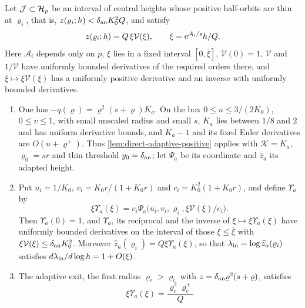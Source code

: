 \begin{lemma}
\label{lem:positive-branch-adaptive-exit}
Let \(\mathcal J\subset\mathcal H_p\) be an interval of central heights whose
positive half-orbits are thin at \(\varrho_i\), that is,
\(z(\varrho_i;h)<\delta_{\rm an}K_0^2Q\), and satisfy
\begin{equation}
\label{eq:positive-adaptive-prefix}
 z(\varrho_i;h)=Q\,\xi\mathcal V(\xi),\qquad \xi=\mathrm e^{\mathcal A_i/s}h/Q .
\end{equation}
Here \(\mathcal A_i\) depends only on \(p\), \(\xi\) lies in a fixed
interval \([0,\bar\xi]\), \(\mathcal V(0)=1\), \(\mathcal V\) and
\(1/\mathcal V\) have uniformly bounded derivatives of the required orders
there, and \(\xi\mapsto\xi\mathcal V(\xi)\) has a uniformly positive
derivative and an inverse with uniformly bounded derivatives.
\begin{enumerate}[label=\textup{(\roman*)}]
\item One has \(-q(\varrho)=\varrho^2(s+\varrho)K_a\). On the box
\(0\le u\le3/(2K_0)\), \(0\le v\le1\), with small unscaled radius and
small \(s\), \(K_a\) lies between \(1/8\) and \(2\) and has uniform
derivative bounds, and \(K_a-1\) and its fixed Euler derivatives are
\(O(u+\varrho^+)\). Thus \cref{lem:direct-adaptive-positive} applies with
\(\mathcal K=K_a\), \(\varrho_0=sr\) and thin threshold \(y_0=\delta_{\rm an}\);
let \(\Psi_a\) be its coordinate and \(\widehat z_a\) its adapted height.
\item Put \(u_i=1/K_0\), \(v_i=K_0r/(1+K_0r)\) and \(c_i=K_0^2(1+K_0r)\),
and define \(\Upsilon_a\) by
\begin{equation}
\label{eq:positive-adaptive-unit}
 \xi\Upsilon_a(\xi)
   =c_i\Psi_a\bigl(u_i,v_i,\varrho_i,\xi\mathcal V(\xi)/c_i\bigr).
\end{equation}
Then \(\Upsilon_a(0)=1\), and \(\Upsilon_a\), its reciprocal and the
inverse of \(\xi\mapsto\xi\Upsilon_a(\xi)\) have uniformly bounded
derivatives on the interval of those \(\xi\le\bar\xi\) with
\(\xi\mathcal V(\xi)\le\delta_{\rm an}K_0^2\). Moreover
\(\widehat z_a(\varrho_i)=Q\xi\Upsilon_a(\xi)\), so that
\(\lambda_{\rm in}=\log\widehat z_a(\varrho_i)\) satisfies
\(d\lambda_{\rm in}/d\log h=1+O(\xi)\).
\item The adaptive exit, the first radius \(\varrho_e>\varrho_i\) with
\(z=\delta_{\rm an}\varrho^2(s+\varrho)\), satisfies
\begin{equation}
\label{eq:direct-no-root-adaptive-input}
 \xi\Upsilon_a(\xi)=\frac{\varrho_e^2\varrho_e^+}{Q}

\end{equation}
\end{enumerate}
\end{lemma}
